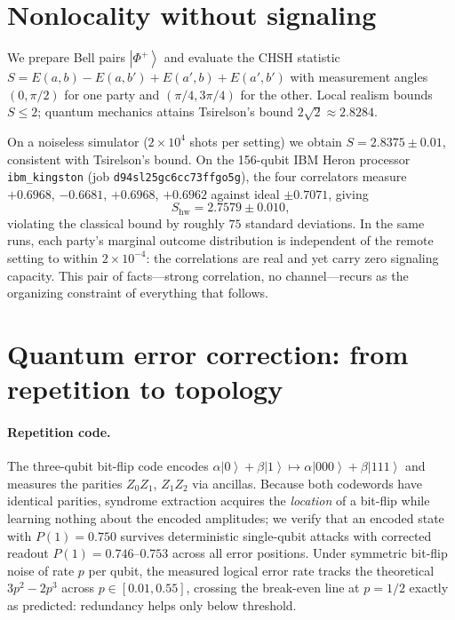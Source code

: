 \documentclass[11pt]{article}
\begin{document}
\section{Nonlocality without signaling}
\label{sec:chsh}

We prepare Bell pairs $\left|\Phi^+\right\rangle$ and evaluate the CHSH
statistic $S = E(a,b) - E(a,b') + E(a',b) + E(a',b')$ with measurement
angles $(0, \pi/2)$ for one party and $(\pi/4, 3\pi/4)$ for the other.
Local realism bounds $S \le 2$; quantum mechanics attains Tsirelson's
bound $2\sqrt{2} \approx 2.8284$.

On a noiseless simulator ($2\times 10^4$ shots per setting) we obtain
$S = 2.8375 \pm 0.01$, consistent with Tsirelson's bound. On the
156-qubit IBM Heron processor \texttt{ibm\_kingston} (job
\texttt{d94sl25gc6cc73ffgo5g}), the four correlators measure
$+0.6968$, $-0.6681$, $+0.6968$, $+0.6962$ against ideal $\pm 0.7071$,
giving
\begin{equation}
S_{\text{hw}} = 2.7579 \pm 0.010,
\end{equation}
violating the classical bound by roughly $75$ standard deviations. In
the same runs, each party's marginal outcome distribution is independent
of the remote setting to within $2\times10^{-4}$: the correlations are
real and yet carry zero signaling capacity. This pair of facts---strong
correlation, no channel---recurs as the organizing constraint of
everything that follows.

\section{Quantum error correction: from repetition to topology}
\label{sec:qec}

\paragraph{Repetition code.} The three-qubit bit-flip code encodes
$\alpha\left|0\right\rangle + \beta\left|1\right\rangle \mapsto
\alpha\left|000\right\rangle + \beta\left|111\right\rangle$ and measures
the parities $Z_0Z_1$, $Z_1Z_2$ via ancillas. Because both codewords have
identical parities, syndrome extraction acquires the \emph{location} of a
bit-flip while learning nothing about the encoded amplitudes; we verify
that an encoded state with $P(1) = 0.750$ survives deterministic
single-qubit attacks with corrected readout $P(1) = 0.746$--$0.753$
across all error positions. Under symmetric bit-flip noise of rate $p$
per qubit, the measured logical error rate tracks the theoretical
$3p^2 - 2p^3$ across $p \in [0.01, 0.55]$, crossing the break-even line
at $p = 1/2$ exactly as predicted: redundancy helps only below threshold.
\end{document}
